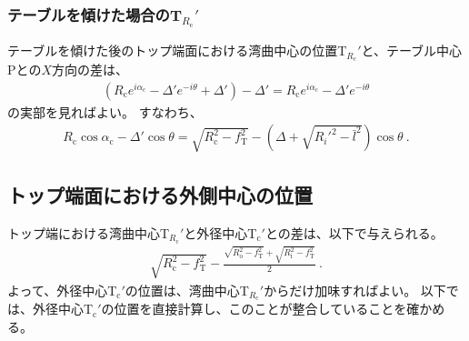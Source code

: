 \subsubsection{テーブルを傾けた場合のT\texorpdfstring{$_{R_\mathrm c}'$}{Rc'}}
テーブルを傾けた後のトップ端面における湾曲中心の位置T$_{R_\mathrm c}'$と、テーブル中心Pとの$X$方向の差は、
\begin{align*}
  \left(R_\mathrm ce^{i\alpha_\mathrm c}-\varDelta'e^{-i\theta}+\varDelta'\right)-\varDelta'
  = R_\mathrm ce^{i\alpha_\mathrm c}-\varDelta'e^{-i\theta}
\end{align*}
の実部を見ればよい。
すなわち、
\begin{align}
  \label{eq:tableTRc}
  R_\mathrm c\cos\alpha_\mathrm c-\varDelta'\cos\theta
  = \sqrt{R_\mathrm c^2-f_\mathrm T^2}-\left(\varDelta+\sqrt{R_i'^2-\bar l^2}\right)\!\cos\theta~.
\end{align}



\subsection{トップ端面における外側中心の位置}
トップ端における湾曲中心T$_{R_\mathrm c}'$と外径中心T$_\mathrm c'$との差は、以下で与えられる。
\begin{align}
  \label{eq:TRc-Tc}
  \sqrt{R_\mathrm c^2-f_\mathrm T^2}
  -\frac{\sqrt{R_\mathrm o^2-f_\mathrm T^2}+\sqrt{R_\mathrm i^2-f_\mathrm T^2}}2\ .
\end{align}
よって、外径中心T$_\mathrm c'$の位置は、湾曲中心T$_{R_\mathrm c}'$からだけ加味すればよい。
以下では、外径中心T$_\mathrm c'$の位置を直接計算し、このことが整合していることを確かめる。



